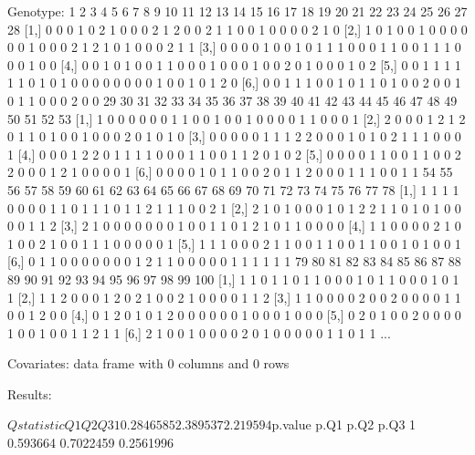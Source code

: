 \documentclass{article}
\begin{document}
\begin{Schunk}
\begin{Soutput}
Genotype:
     1 2 3 4 5 6 7 8 9 10 11 12 13 14 15 16 17 18 19 20 21 22 23 24 25 26 27 28
[1,] 0 0 0 1 0 2 1 0 0  0  2  1  2  0  0  2  1  1  0  0  1  0  0  0  0  2  1  0
[2,] 1 0 1 0 0 1 0 0 0  0  0  0  1  0  0  0  2  1  2  1  0  1  0  0  0  2  1  1
[3,] 0 0 0 0 1 0 0 1 0  1  1  1  0  0  0  1  1  0  0  1  1  1  0  0  0  1  0  0
[4,] 0 0 1 0 1 0 0 1 1  0  0  0  1  0  0  0  1  0  0  2  0  1  0  0  0  1  0  2
[5,] 0 0 1 1 1 1 1 1 0  1  0  1  0  0  0  0  0  0  0  0  1  0  0  1  0  1  2  0
[6,] 0 0 1 1 1 0 0 1 0  1  1  0  1  0  0  2  0  0  1  0  1  1  0  0  0  2  0  0
     29 30 31 32 33 34 35 36 37 38 39 40 41 42 43 44 45 46 47 48 49 50 51 52 53
[1,]  1  0  0  0  0  0  0  1  1  0  0  1  0  0  1  0  0  0  0  1  1  0  0  0  1
[2,]  2  0  0  0  1  2  1  2  0  1  1  0  1  0  0  1  0  0  0  2  0  1  0  1  0
[3,]  0  0  0  0  0  1  1  1  2  2  0  0  0  1  0  1  0  2  1  1  1  0  0  0  1
[4,]  0  0  0  1  2  2  0  1  1  1  1  0  0  0  1  1  0  0  1  1  2  0  1  0  2
[5,]  0  0  0  0  1  1  0  0  1  1  0  0  2  2  0  0  0  1  2  1  0  0  0  0  1
[6,]  0  0  0  0  1  0  1  1  0  0  2  0  1  1  2  0  0  0  1  1  1  0  0  1  1
     54 55 56 57 58 59 60 61 62 63 64 65 66 67 68 69 70 71 72 73 74 75 76 77 78
[1,]  1  1  1  1  0  0  0  0  1  1  0  1  1  1  0  1  1  2  1  1  1  0  0  2  1
[2,]  2  1  0  1  0  0  0  1  0  1  2  2  1  1  0  1  0  1  0  0  0  0  1  1  2
[3,]  2  1  0  0  0  0  0  0  0  1  0  0  1  1  0  1  2  1  0  1  1  0  0  0  0
[4,]  1  1  0  0  0  0  2  1  0  1  0  0  2  1  0  0  1  1  1  0  0  0  0  0  1
[5,]  1  1  1  0  0  0  2  1  1  0  0  1  1  0  0  1  1  0  0  1  0  1  0  0  1
[6,]  0  1  1  0  0  0  0  0  0  0  1  2  1  1  0  0  0  0  0  1  1  1  1  1  1
     79 80 81 82 83 84 85 86 87 88 89 90 91 92 93 94 95 96 97 98 99 100
[1,]  1  1  0  1  1  0  1  1  0  0  0  1  0  1  1  0  0  0  1  0  1   1
[2,]  1  1  2  0  0  0  1  2  0  2  1  0  0  2  1  0  0  0  0  1  1   2
[3,]  1  1  0  0  0  0  2  0  0  2  0  0  0  0  1  1  0  0  1  2  0   0
[4,]  0  1  2  0  1  0  1  2  0  0  0  0  0  0  1  0  0  0  1  0  0   0
[5,]  0  2  0  1  0  0  2  0  0  0  0  1  0  0  1  0  0  1  1  2  1   1
[6,]  2  1  0  0  1  0  0  0  0  2  0  1  0  0  0  0  0  1  1  0  1   1
...

Covariates:
data frame with 0 columns and 0 rows


Results:

$Qstatistic
         Q1       Q2       Q3
1 0.2846585 2.389537 2.219594

$p.value
      p.Q1      p.Q2      p.Q3
1 0.593664 0.7022459 0.2561996
\end{Soutput}
\end{Schunk}
\end{document}
